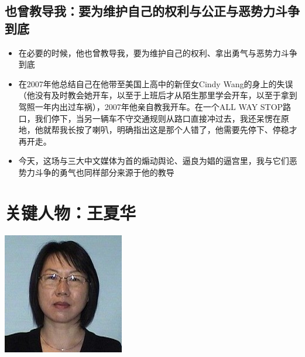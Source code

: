\documentclass[9pt, b5paper]{article}
\begin{document}
\subsection{也曾教导我：要为维护自己的权利与公正与恶势力斗争到底}
\label{sec-2-7}
\begin{itemize}
\item 在必要的时候，他也曾教导我，要为维护自己的权利、拿出勇气与恶势力斗争到底
\item 在2007年他总结自己在他带至美国上高中的新侄女Cindy Wang的身上的失误（他没有及时教会她开车，以至于上班后才从陌生那里学会开车，以至于拿到驾照一年内出过车祸），2007年他亲自教我开车。在一个ALL WAY STOP路口，我们停下，当另一辆车不守交通规则从路口直接冲过去，我还呆愣在原地，他就帮我长按了喇叭，明确指出这是那个人错了，他需要先停下、停稳才再开走。
\item 今天，这场与三大中文媒体为首的煽动舆论、逼良为娼的逼宫里，我与它们恶势力斗争的勇气也同样部分来源于他的教导
\end{itemize}


\section{关键人物：王夏华}
\label{sec-3}

\includegraphics[width=.9\linewidth]{./pic/Sherry Wang.jpg}
\end{document}
